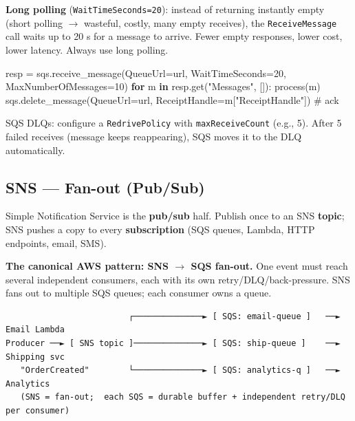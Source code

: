 \documentclass[11pt]{article}
\newenvironment{Shaded}{\begin{snugshade}}{\end{snugshade}}
\newcommand{\CommentTok}[1]{\textcolor[rgb]{0.48,0.49,0.49}{#1}}
\newcommand{\ControlFlowTok}[1]{\textcolor[rgb]{0.99,0.74,0.29}{\textbf{#1}}}
\newcommand{\DecValTok}[1]{\textcolor[rgb]{0.96,0.45,0.00}{#1}}
\newcommand{\KeywordTok}[1]{\textcolor[rgb]{0.81,0.81,0.76}{\textbf{#1}}}
\newcommand{\NormalTok}[1]{\textcolor[rgb]{0.81,0.81,0.76}{#1}}
\newcommand{\OperatorTok}[1]{\textcolor[rgb]{0.81,0.81,0.76}{#1}}
\newcommand{\StringTok}[1]{\textcolor[rgb]{0.96,0.31,0.31}{#1}}
\begin{document}
\textbf{Long polling} (\texttt{WaitTimeSeconds=20}): instead of returning instantly empty (short polling \(\rightarrow\) wasteful, costly, many empty receives), the \texttt{ReceiveMessage} call waits up to 20 s for a message to arrive. Fewer empty responses, lower cost, lower latency. Always use long polling.


\begin{Shaded}
\begin{Highlighting}[]
\NormalTok{resp }\OperatorTok{=}\NormalTok{ sqs.receive\_message(QueueUrl}\OperatorTok{=}\NormalTok{url, WaitTimeSeconds}\OperatorTok{=}\DecValTok{20}\NormalTok{, MaxNumberOfMessages}\OperatorTok{=}\DecValTok{10}\NormalTok{)}
\ControlFlowTok{for}\NormalTok{ m }\KeywordTok{in}\NormalTok{ resp.get(}\StringTok{"Messages"}\NormalTok{, []):}
\NormalTok{    process(m)}
\NormalTok{    sqs.delete\_message(QueueUrl}\OperatorTok{=}\NormalTok{url, ReceiptHandle}\OperatorTok{=}\NormalTok{m[}\StringTok{"ReceiptHandle"}\NormalTok{])  }\CommentTok{\# ack}
\end{Highlighting}
\end{Shaded}

SQS DLQs: configure a \texttt{RedrivePolicy} with \texttt{maxReceiveCount} (e.g., 5). After 5 failed receives (message keeps reappearing), SQS moves it to the DLQ automatically.

\subsection{SNS --- Fan-out (Pub/Sub)}\label{sns--fan-out-pubsub}

Simple Notification Service is the \textbf{pub/sub} half. Publish once to an SNS \textbf{topic}; SNS pushes a copy to every \textbf{subscription} (SQS queues, Lambda, HTTP endpoints, email, SMS).

\textbf{The canonical AWS pattern: SNS \(\rightarrow\) SQS fan-out.} One event must reach several independent consumers, each with its own retry/DLQ/back-pressure. SNS fans out to multiple SQS queues; each consumer owns a queue.

\setcodelang{}

\begin{verbatim}
                         ┌──────────────► [ SQS: email-queue ]   ──► Email Lambda
Producer ──► [ SNS topic ]──────────────► [ SQS: ship-queue ]    ──► Shipping svc
   "OrderCreated"        └──────────────► [ SQS: analytics-q ]   ──► Analytics
   (SNS = fan-out;  each SQS = durable buffer + independent retry/DLQ per consumer)
\end{verbatim}
\end{document}
